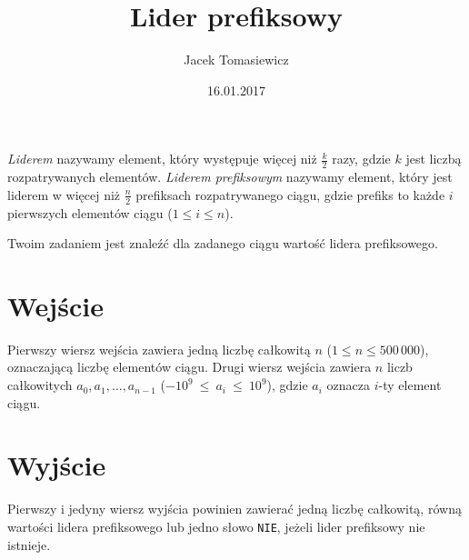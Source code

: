 \documentclass[zad,zawodnik,utf8]{sinol}
\title{Lider prefiksowy}
\author{Jacek Tomasiewicz} %
\date{16.01.2017}
\begin{document}
  \begin{tasktext}%
	\textit{Liderem} nazywamy element, który występuje więcej niż $\frac{k}{2}$ razy, gdzie $k$ jest liczbą rozpatrywanych elementów.
    \textit{Liderem prefiksowym} nazywamy element, który jest liderem w więcej niż $\frac{n}{2}$ prefiksach rozpatrywanego ciągu, 
    gdzie prefiks to każde $i$ pierwszych elementów ciągu ($1 \leq i \leq n$).
    
    Twoim zadaniem jest znaleźć dla zadanego ciągu wartość lidera prefiksowego.

  \section{Wejście}

	Pierwszy wiersz wejścia zawiera jedną liczbę całkowitą $n$ ($1 \leq n \leq 500\,000$), oznaczającą liczbę elementów ciągu. 
    Drugi wiersz wejścia zawiera $n$ liczb całkowitych $a_0, a_1, \ldots, a_{n-1}$ ($-10^9~\leq~a_i~\leq~10^9$), 
    gdzie $a_i$ oznacza $i$-ty element ciągu.

  \section{Wyjście}

	Pierwszy i jedyny wiersz wyjścia powinien zawierać jedną liczbę całkowitą, 
    równą wartości lidera prefiksowego lub jedno słowo \texttt{NIE}, jeżeli lider prefiksowy nie istnieje.

     \makecompactexample

  \end{tasktext}
\end{document}
